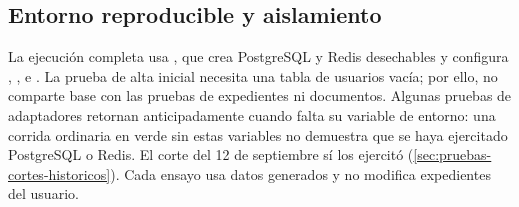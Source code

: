 \subsection{Entorno reproducible y aislamiento}\label{sec:pruebas-backends}

La ejecución completa usa , que crea PostgreSQL y Redis desechables y configura , ,  e . La prueba de alta inicial necesita una tabla de usuarios vacía; por ello, no comparte base con las pruebas de expedientes ni documentos. Algunas pruebas de adaptadores retornan anticipadamente cuando falta su variable de entorno: una corrida ordinaria en verde sin estas variables no demuestra que se haya ejercitado PostgreSQL o Redis. El corte del 12 de septiembre sí los ejercitó (\cref{sec:pruebas-cortes-historicos}). Cada ensayo usa datos generados y no modifica expedientes del usuario.

